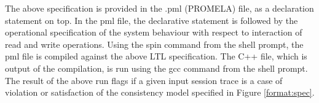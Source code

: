\documentclass[journal,compsoc]{IEEEtran}
\begin{document}
  \par The above specification is provided in the .pml (PROMELA) file, as a declaration statement on top. In the pml file, the declarative statement is followed by the operational specification of the system behaviour with respect to interaction of read and write operations. Using the spin command from the shell prompt,  the pml file is compiled against the above LTL specification.  The C++ file, which is output of the compilation, is run using the gcc command from the shell prompt. The result of the above run flags if a given input session trace is a case of violation or satisfaction of the consistency model specified in Figure \ref{format:spec}.  
  


\end{document}
